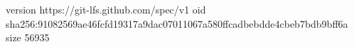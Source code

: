 version https://git-lfs.github.com/spec/v1
oid sha256:91082569ae46fcfd19317a9dac07011067a580ffcadbebdde4cbeb7bdb9bff6a
size 56935
